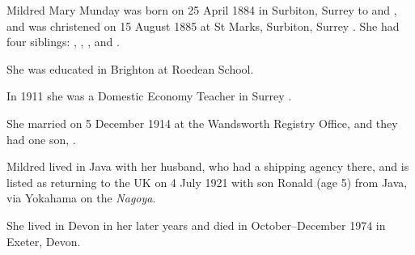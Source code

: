 
Mildred Mary Munday was born on 25 April 1884 in Surbiton, Surrey to  and , and was christened on 15 August 1885 at St Marks, Surbiton, Surrey \cite{MildredMundayBirth}.
She had four siblings: , , , and .

She was educated in Brighton at Roedean School.

In 1911 she was a Domestic Economy Teacher in Surrey \cite{MildredMundayOccupation}.

She married  on 5 December 1914  at the Wandsworth Registry Office, and they had one son, .

Mildred lived in Java with her husband, who had a shipping agency there, and is listed as returning to the UK on 4 July 1921 with son Ronald (age 5) from Java, via Yokahama on the \emph{Nagoya}.\cite{MildredMundayTravel}

She lived in Devon in her later years and died in October--December 1974 in Exeter, Devon.\cite{MildredMundayDeath}
